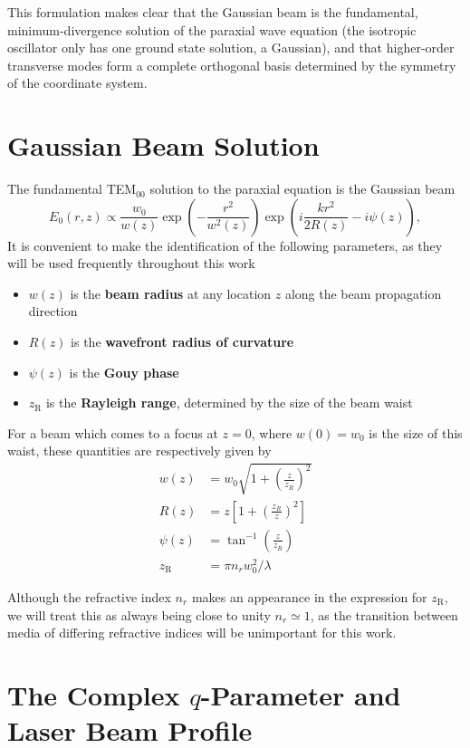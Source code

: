 This formulation makes clear that the Gaussian beam is the fundamental, minimum-divergence solution of the paraxial wave equation (the isotropic oscillator only has one ground state solution, a Gaussian), and that higher-order transverse modes form a complete orthogonal basis determined by the symmetry of the coordinate system.

\section{Gaussian Beam Solution}

The fundamental TEM$_{00}$ solution to the paraxial equation is the Gaussian beam
\begin{equation} \label{gauss_TEM00}
	E_0(r,z) \propto \frac{w_0}{w(z)} \exp\left(-\frac{r^2}{w^2(z)}\right)
	\exp\left(i\frac{kr^2}{2R(z)} - i\psi(z)\right),
\end{equation}
It is convenient to make the identification of the following parameters, as they will be used frequently throughout this work
\begin{itemize}
	\item $w(z)$ is the \textbf{beam radius} at any location $z$ along the beam propagation direction
	\item $R(z)$ is the \textbf{wavefront radius of curvature}
	\item $\psi(z)$ is the \textbf{Gouy phase}
	\item $z_\mathrm{R}$ is the \textbf{Rayleigh range}, determined by the size of the beam waist
\end{itemize}
For a beam which comes to a focus at $z=0$, where $w(0) = w_0$ is the size of this waist, these quantities are respectively given by
\begin{align}
	w(z) &= w_0 \sqrt{1 + \left(\frac{z}{z_R}\right)^2} \\
	R(z) &= z\left[1 + \left(\frac{z_R}{z}\right)^2\right] \\
	\psi(z) &= \tan^{-1}\left(\frac{z}{z_R}\right) \\
	z_\mathrm{R} &= \pi n_r w_0^2/\lambda
\end{align}

Although the refractive index $n_r$ makes an appearance in the expression for $z_\mathrm{R}$, we will treat this as always being close to unity $n_r\simeq 1$, as the transition between media of differing refractive indices will be unimportant for this work.

\section{The Complex $q$-Parameter and Laser Beam Profile}

